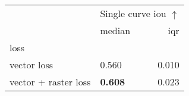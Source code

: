 \begin{tabular}{llr}
\toprule
 & \multicolumn{2}{c}{Single curve \acrshort{iou} $\uparrow$} \\
 & median & \acrshort{iqr} \\
loss &  &  \\
\midrule
vector loss & 0.560 & 0.010 \\
vector + raster loss & \textbf{0.608} & 0.023 \\
\bottomrule
\end{tabular}
